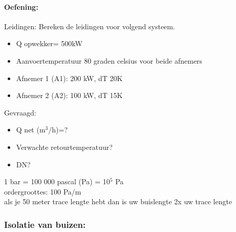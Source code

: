 \documentclass[12pt]{article}
\begin{document}
\paragraph{Oefening:}
Leidingen: Bereken de leidingen voor volgend systeem.\begin{itemize}
    \item Q opwekker= 500kW 
    \item Aanvoertemperatuur 80 graden celsius voor beide afnemers
    \item Afnemer 1 (A1): 200 kW, dT 20K 
    \item Afnemer 2 (A2): 100 kW, dT 15K
\end{itemize}
Gevraagd:\begin{itemize}
    \item Q net (m$^3$/h)=? 
    \item Verwachte retourtemperatuur? 
    \item DN?
\end{itemize}
1 bar = 100 000 pascal (Pa) = 10$^5$ Pa\bigskip \\
ordergroottes: 100 Pa/m\bigskip \\
als je 50 meter trace lengte hebt dan is uw buislengte 2x uw trace lengte
\subsubsection{Isolatie van buizen:}
\end{document}
